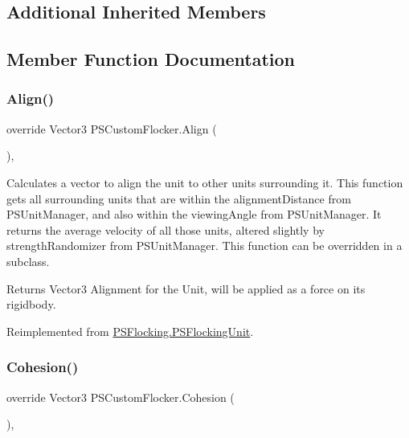\subsection*{Additional Inherited Members}


\subsection{Member Function Documentation}
\mbox{\label{class_p_s_custom_flocker_a50d8ac4146196420bcf1181289a27e40}} 
\subsubsection{\texorpdfstring{Align()}{Align()}}
{\footnotesize\ttfamily override Vector3 P\+S\+Custom\+Flocker.\+Align (\begin{DoxyParamCaption}{ }\end{DoxyParamCaption})\hspace{0.3cm}{\ttfamily [protected]}, {\ttfamily [virtual]}}



Calculates a vector to align the unit to other units surrounding it. This function gets all surrounding units that are within the alignment\+Distance from P\+S\+Unit\+Manager, and also within the viewing\+Angle from P\+S\+Unit\+Manager. It returns the average velocity of all those units, altered slightly by strength\+Randomizer from P\+S\+Unit\+Manager. This function can be overridden in a subclass. 

\begin{DoxyReturn}{Returns}
Vector3 Alignment for the Unit, will be applied as a force on its rigidbody. 
\end{DoxyReturn}


Reimplemented from \hyperlink{class_p_s_flocking_1_1_p_s_flocking_unit_ada3fa9e23f12a1b8258dc324f5b3e511}{P\+S\+Flocking.\+P\+S\+Flocking\+Unit}.

\mbox{\label{class_p_s_custom_flocker_a46d7ff69872c12983a666293794b976f}} 
\subsubsection{\texorpdfstring{Cohesion()}{Cohesion()}}
{\footnotesize\ttfamily override Vector3 P\+S\+Custom\+Flocker.\+Cohesion (\begin{DoxyParamCaption}{ }\end{DoxyParamCaption})\hspace{0.3cm}{\ttfamily [protected]}, {\ttfamily [virtual]}}



